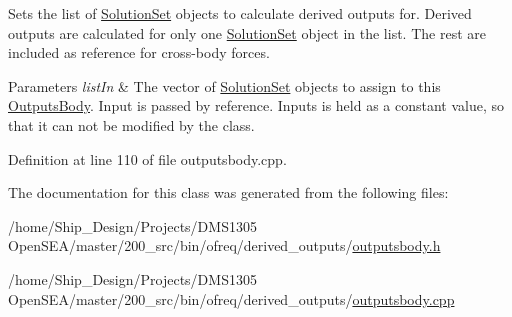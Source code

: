 Sets the list of \hyperlink{classosea_1_1ofreq_1_1_solution_set}{Solution\-Set} objects to calculate derived outputs for. Derived outputs are calculated for only one \hyperlink{classosea_1_1ofreq_1_1_solution_set}{Solution\-Set} object in the list. The rest are included as reference for cross-\/body forces. 


\begin{DoxyParams}{Parameters}
{\em list\-In} & The vector of \hyperlink{classosea_1_1ofreq_1_1_solution_set}{Solution\-Set} objects to assign to this \hyperlink{classosea_1_1ofreq_1_1_outputs_body}{Outputs\-Body}. Input is passed by reference. Inputs is held as a constant value, so that it can not be modified by the class. \\
\hline
\end{DoxyParams}


Definition at line 110 of file outputsbody.\-cpp.



The documentation for this class was generated from the following files\-:\begin{DoxyCompactItemize}
\item 
/home/\-Ship\-\_\-\-Design/\-Projects/\-D\-M\-S1305 Open\-S\-E\-A/master/200\-\_\-src/bin/ofreq/derived\-\_\-outputs/\hyperlink{outputsbody_8h}{outputsbody.\-h}\item 
/home/\-Ship\-\_\-\-Design/\-Projects/\-D\-M\-S1305 Open\-S\-E\-A/master/200\-\_\-src/bin/ofreq/derived\-\_\-outputs/\hyperlink{outputsbody_8cpp}{outputsbody.\-cpp}\end{DoxyCompactItemize}
